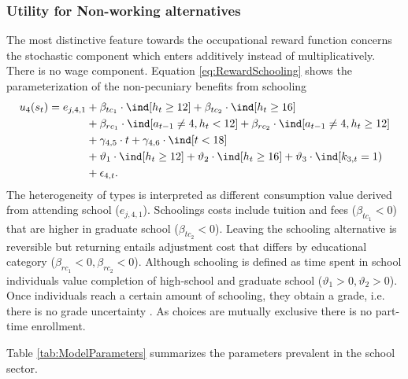 \FloatBarrier\subsubsection{Utility for Non-working alternatives}
The most distinctive feature towards the occupational reward function concerns the stochastic component which enters additively instead of multiplicatively. There is no wage component.
\FloatBarrier{}
Equation \ref{eq:RewardSchooling} shows the parameterization of the non-pecuniary benefits from schooling
%
\begin{align}\label{eq:RewardSchooling}
	u_{4}(s_t) = e_{j, 4, 1} & + \beta_{tc_1} \cdot \ind[h_t \geq 12] + \beta_{tc_2} \cdot \ind[h_t \geq 16] 														\nonumber \\
    							  & + \beta_{rc_1} \cdot \ind[a_{t-1} \neq 4, h_t < 12] + \beta_{rc_2} \cdot \ind[a_{t-1} \neq 4, h_t \geq 12] 			   \nonumber \\
    							  & + \gamma_{4,5} \cdot t + \gamma_{4,6} \cdot \ind[t < 18] 																					  \nonumber \\
     							  & + \vartheta_1 \cdot \ind[h_t \geq 12] + \vartheta_2 \cdot \ind[h_t \geq 16] + \vartheta_3 \cdot \ind[k_{3,t} = 1) \nonumber \\
      							  & + \epsilon_{4,t}.
\end{align}
%
The heterogeneity of types is interpreted as different consumption value derived from attending school ($e_{j,4,1}$). Schoolings costs include tuition and fees ($\beta_{tc_1} < 0$) that are higher in graduate school ($\beta_{tc_2} < 0$). Leaving the schooling alternative is reversible but returning entails adjustment cost that differs by educational category ($\beta_{rc_1} <0, \beta_{rc_2} < 0$). Although schooling is defined as time spent in school individuals value completion of high-school and graduate school ($\vartheta_1 > 0, \vartheta_2 > 0$). Once individuals reach a certain amount of schooling, they obtain a grade, i.e. there is no grade uncertainty \citep{Altonji.1993}. As choices are mutually exclusive there is no part-time enrollment.

Table \ref{tab:ModelParameters} summarizes the parameters prevalent in the school sector.


